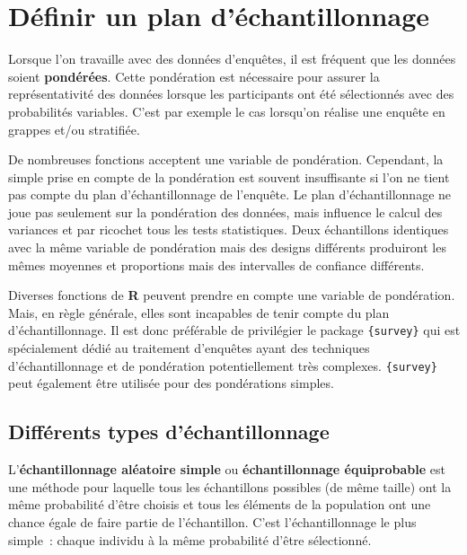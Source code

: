 \documentclass[
  letterpaper,
  DIV=11,
  numbers=noendperiod,
  oneside]{scrreprt}
\begin{document}
\hypertarget{sec-plan-echantillonnage}{%
\chapter{Définir un plan
d'échantillonnage}\label{sec-plan-echantillonnage}}

Lorsque l'on travaille avec des données d'enquêtes, il est fréquent que
les données soient \textbf{pondérées}. Cette pondération est nécessaire
pour assurer la représentativité des données lorsque les participants
ont été sélectionnés avec des probabilités variables. C'est par exemple
le cas lorsqu'on réalise une enquête en grappes et/ou stratifiée.

De nombreuses fonctions acceptent une variable de pondération.
Cependant, la simple prise en compte de la pondération est souvent
insuffisante si l'on ne tient pas compte du plan d'échantillonnage de
l'enquête. Le plan d'échantillonnage ne joue pas seulement sur la
pondération des données, mais influence le calcul des variances et par
ricochet tous les tests statistiques. Deux échantillons identiques avec
la même variable de pondération mais des designs différents produiront
les mêmes moyennes et proportions mais des intervalles de confiance
différents.

Diverses fonctions de \textbf{R} peuvent prendre en compte une variable
de pondération. Mais, en règle générale, elles sont incapables de tenir
compte du plan d'échantillonnage. Il est donc préférable de privilégier
le package \texttt{\{survey\}} qui est spécialement dédié au traitement
d'enquêtes ayant des techniques d'échantillonnage et de pondération
potentiellement très complexes. \texttt{\{survey\}} peut également être
utilisée pour des pondérations simples.

\hypertarget{diffuxe9rents-types-duxe9chantillonnage}{%
\section{Différents types
d'échantillonnage}\label{diffuxe9rents-types-duxe9chantillonnage}}

L'\textbf{échantillonnage aléatoire simple} ou \textbf{échantillonnage
équiprobable} est une méthode pour laquelle tous les échantillons
possibles (de même taille) ont la même probabilité d'être choisis et
tous les éléments de la population ont une chance égale de faire partie
de l'échantillon. C'est l'échantillonnage le plus simple~: chaque
individu à la même probabilité d'être sélectionné.
\end{document}
